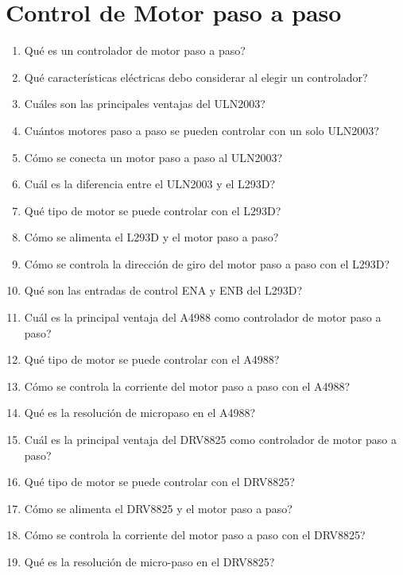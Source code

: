 \documentclass[../main]{subfiles}
\begin{document}
\chapter{Control de Motor paso a paso}
\begin{enumerate}
\item \textquestiondown{}Qu\'e{} es un controlador de motor paso a paso?
\item \textquestiondown{}Qu\'e{} caracter\'isticas el\'ectricas debo considerar al elegir un controlador?
\item \textquestiondown{}Cu\'ales{} son las principales ventajas del ULN2003?
\item \textquestiondown{}Cu\'antos{} motores paso a paso se pueden controlar con un solo ULN2003?
\item \textquestiondown{}C\'omo{} se conecta un motor paso a paso al ULN2003?
\item \textquestiondown{}Cu\'al{} es la diferencia entre el ULN2003 y el L293D?
\item \textquestiondown{}Qu\'e{} tipo de motor se puede controlar con el L293D?
\item \textquestiondown{}C\'omo{} se alimenta el L293D y el motor paso a paso?
\item \textquestiondown{}C\'omo{} se controla la direcci\'on{} de giro del motor paso a paso con el L293D?
\item \textquestiondown{}Qu\'e{} son las entradas de control ENA y ENB del L293D?
\item \textquestiondown{}Cu\'al{} es la principal ventaja del A4988 como controlador de motor paso a paso?
\item \textquestiondown{}Qu\'e{} tipo de motor se puede controlar con el A4988?
\item \textquestiondown{}C\'omo{} se controla la corriente del motor paso a paso con el A4988?
\item \textquestiondown{}Qu\'e{} es la resoluci\'on{} de micropaso en el A4988?
\item \textquestiondown{}Cu\'al{} es la principal ventaja del DRV8825 como controlador de motor paso a paso?
\item \textquestiondown{}Qu\'e{} tipo de motor se puede controlar con el DRV8825?
\item \textquestiondown{}C\'omo{} se alimenta el DRV8825 y el motor paso a paso?
\item \textquestiondown{}C\'omo{} se controla la corriente del motor paso a paso con el DRV8825?
\item \textquestiondown{}Qu\'e{} es la resoluci\'on{} de micro-paso en el DRV8825?
\end{enumerate}
\end{document}

